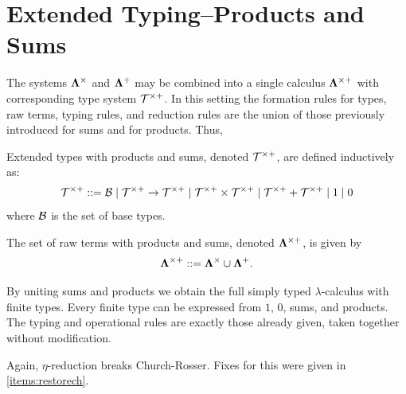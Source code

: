 \section{\centering Extended Typing--Products and Sums}
The systems $\mathbf{\Lambda}^\times$ and $\mathbf{\Lambda}^+$ may be combined into a single calculus
$\mathbf{\Lambda}^{\times+}$ with corresponding type system $\mathcal{T}^{\times+}$. In this setting
the formation rules for types, raw terms, typing rules, and reduction rules are
the union of those previously introduced for sums and for products. 
Thus,
\begin{definition}
  Extended types with products and sums, denoted \( \mathcal{T}^{\times+} \), are defined inductively as:
  \[
    \mathcal{T}^{\times+} ::= \mathcal{B} 
    \mid \mathcal{T}^{\times+} \to \mathcal{T}^{\times+} 
    \mid \mathcal{T}^{\times+} \times \mathcal{T}^{\times+} 
    \mid \mathcal{T}^{\times+} + \mathcal{T}^{\times+} 
    \mid 1 
    \mid 0
  \]
  where \( \mathcal{B} \) is the set of base types.
\end{definition}
\begin{definition}
  The set of raw terms with products and sums, denoted \( \mathbf{\Lambda}^{\times+} \), is given by
  \[
    \mathbf{\Lambda}^{\times+} ::= \mathbf{\Lambda}^\times \cup \mathbf{\Lambda}^+ .
  \]
\end{definition}
\begin{remark}
  By uniting sums and products we obtain the full simply typed $\lambda$-calculus
  with finite types. Every finite type can be expressed from $1$, $0$, sums, and
  products. The typing and operational rules are exactly those already given,
  taken together without modification.
\end{remark}
\begin{remark}
  Again, $\eta$-reduction breaks Church-Rosser. Fixes for this were given in \ref{items:restorech}.
\end{remark}
